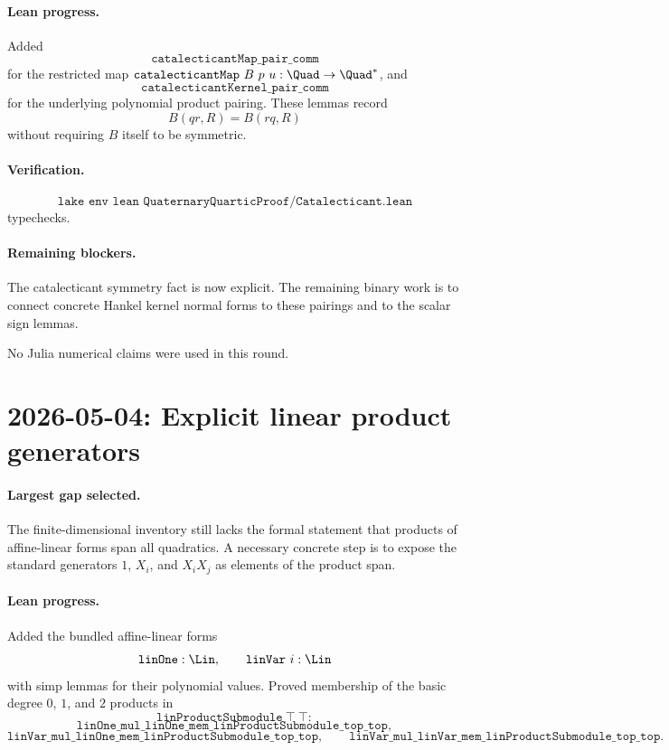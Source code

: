 \documentclass[11pt]{article}
\begin{document}
\paragraph{Lean progress.}
Added
\[
\texttt{catalecticantMap\_pair\_comm}
\]
for the restricted map
\(\texttt{catalecticantMap}\ B\ p\ u:\Quad\to\Quad^\ast\), and
\[
\texttt{catalecticantKernel\_pair\_comm}
\]
for the underlying polynomial product pairing.  These lemmas record
\[
B(qr,R)=B(rq,R)
\]
without requiring \(B\) itself to be symmetric.

\paragraph{Verification.}
\[
\texttt{lake env lean QuaternaryQuarticProof/Catalecticant.lean}
\]
typechecks.

\paragraph{Remaining blockers.}
The catalecticant symmetry fact is now explicit.  The remaining binary work is
to connect concrete Hankel kernel normal forms to these pairings and to the
scalar sign lemmas.

No Julia numerical claims were used in this round.

\section*{2026-05-04: Explicit linear product generators}

\paragraph{Largest gap selected.}
The finite-dimensional inventory still lacks the formal statement that
products of affine-linear forms span all quadratics.  A necessary concrete
step is to expose the standard generators \(1\), \(X_i\), and \(X_iX_j\) as
elements of the product span.

\paragraph{Lean progress.}
Added the bundled affine-linear forms
\[
\texttt{linOne}:\Lin,\qquad \texttt{linVar}\ i:\Lin
\]
with simp lemmas for their polynomial values.  Proved membership of the
basic degree \(0\), \(1\), and \(2\) products in
\[
\texttt{linProductSubmodule}\ \top\ \top:
\]
\[
\texttt{linOne\_mul\_linOne\_mem\_linProductSubmodule\_top\_top},
\]
\[
\texttt{linVar\_mul\_linOne\_mem\_linProductSubmodule\_top\_top},
\qquad
\texttt{linVar\_mul\_linVar\_mem\_linProductSubmodule\_top\_top}.
\]
\end{document}
